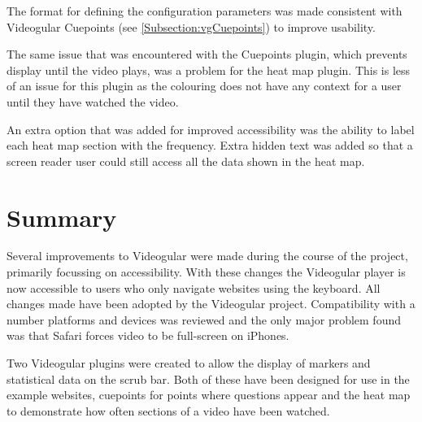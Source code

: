 The format for defining the configuration parameters was made consistent with Videogular Cuepoints (see \autoref{Subsection:vgCuepoints}) to improve usability.

The same issue that was encountered with the Cuepoints plugin, which prevents display until the video plays, was a problem for the heat map plugin. This is less of an issue for this plugin as the colouring does not have any context for a user until they have watched the video.

An extra option that was added for improved accessibility was the ability to label each heat map section with the frequency. Extra hidden text was added so that a screen reader user could still access all the data shown in the heat map.

\section{Summary}

Several improvements to \gls{Videogular} were made during the course of the project, primarily focussing on accessibility. With these changes the \gls{Videogular} player is now accessible to users who only navigate websites using the keyboard. All changes made have been adopted by the \gls{Videogular} project. Compatibility with a number platforms and devices was reviewed and the only major problem found was that Safari forces video to be full-screen on iPhones.

Two \gls{Videogular} plugins were created to allow the display of markers and statistical data on the \gls{scrub bar}. Both of these have been designed for use in the example websites, cuepoints for points where questions appear and the heat map to demonstrate how often sections of a video have been watched.


